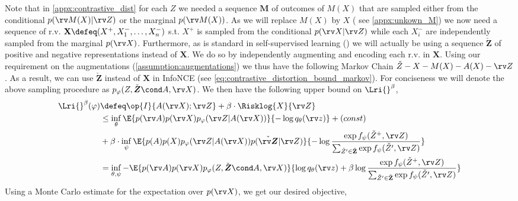 \documentclass[final]{article}
\begin{document}
Note that in \cref{appx:contrastive_dist} for each $Z$ we needed a sequence $\textbf{M}$ of outcomes of $M(X)$ that are sampled either from the conditional $p(\rv M(X) | \rv Z)$ or the marginal  $p(\rv M(X))$.
As we will replace $M(X)$ by $X$ ( see \cref{appx:unkown_M}) we now need a sequence of r.v. $\textbf{X} \defeq (X^+,X^-_1,\dots,X^-_n)$  s.t. $X^+$ is  sampled from the conditional $p(\rv X|\rv Z)$ while each $X^-_i$ are independently sampled from the marginal $p(\rv X)$.
Furthermore, as is standard in self-supervised learning (\eg \cite{chen_simple_2020,oord_representation_2019}) we will actually be using a sequence $\check{\textbf{Z}}$ of positive and negative representations instead of $\textbf{X}$.
We do so by independently augmenting and encoding each r.v. in $\textbf{X}$.
Using our requirement on the augmentations (\cref{assumption:augmentations}) we thus have the following Markov Chain $\check{Z} - X - M(X) - A(X) - \rv Z$.
As a result, we can use $\check{\mathbf{Z}}$ instead of $\textbf{X}$ in InfoNCE (see \cref{eq:contrastive_distortion_bound_markov}).
For conciseness we will denote the above sampling procedure as $p_\varphi(Z,\check{\boldsymbol{Z}} \cond A, \rv X)$.
We then have the following upper bound on $\Lri{}^\beta$,
\begin{align}
\Lri{}^\beta(\varphi) 
&\defeq \op{I}{A(\rv X); \rv Z} + \beta \cdot \Risklog{X}{\rv Z} \\
&\leq \inf_{\theta} \E{ p(\rv A)p(\rv X)p_{\varphi}(\rv Z | A(\rv X)) } {- \log q_{\theta}(\rv z)} + (const)    \\
&+ \beta \cdot \inf_{\psi}  \E{p(A)p(X)p_{\varphi}(\rv Z | A(\rv X)) p(\check{\boldsymbol{\rv Z}} | \rv Z)}{- \log \frac{\exp f_\psi(\check Z^+, \rv Z)}{\sum_{\check Z' \in \check{\mathbf{Z}}} \exp f_\psi(\check Z', \rv Z) }} \\
&=  \inf_{\theta,\psi} - \E{ p(\rv A)p(\rv X)p_\varphi(Z,\check{\boldsymbol{Z}} \cond A, \rv X) } {  \log q_{\theta}(\rv z) + \beta \log \frac{\exp f_\psi(\check Z^+, \rv Z)}{\sum_{\check{Z}' \in \check{\mathbf{Z}}} \exp f_\psi(\check{Z}', \rv Z) }}  \label{eq:upperbound_bince} 
\end{align}
Using a Monte Carlo estimate for the expectation over $p(\rv X)$, we get our desired objective,
\end{document}
